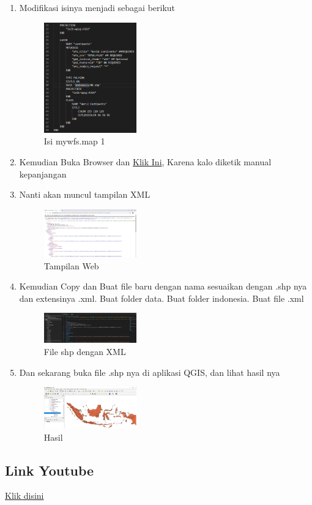 \begin{enumerate}
  \item Modifikasi isinya menjadi sebagai berikut
  \hfill\break
    \begin{figure}[H]
		\includegraphics[width=4cm]{figures/1174008/4/14.png}
		\centering
		\caption{Isi mywfs.map 1}
    \end{figure}

  \item Kemudian Buka Browser dan \href{http://localhost:8080/cgi-bin/mapserv.exe?map=/ms4w/apps/mywfs/mywfs.map&SERVICE=WFS&VERSION=1.0.0&REQUEST=GetCapabilities}{Klik Ini}, Karena kalo diketik manual kepanjangan
  \item Nanti akan muncul tampilan XML
  \hfill\break
    \begin{figure}[H]
		\includegraphics[width=4cm]{figures/1174008/4/15.png}
		\centering
		\caption{Tampilan Web}
    \end{figure}

  \item Kemudian Copy dan Buat file baru dengan nama sesuaikan dengan .shp nya dan extensinya .xml. Buat folder data. Buat folder indonesia. Buat file .xml

  \hfill\break
  \begin{figure}[H]
  \includegraphics[width=4cm]{figures/1174008/4/16.png}
  \centering
  \caption{File shp dengan XML}
  \end{figure}

  \item Dan sekarang buka file .shp nya di aplikasi QGIS, dan lihat hasil nya
  \hfill\break
  \begin{figure}[H]
  \includegraphics[width=4cm]{figures/1174008/4/17.png}
  \centering
  \caption{Hasil}
  \end{figure}
\end{enumerate}
\subsection{Link Youtube}
\href{https://www.youtube.com/watch?v=aXiYzIKbt-o&feature=youtu.be}{Klik disini}